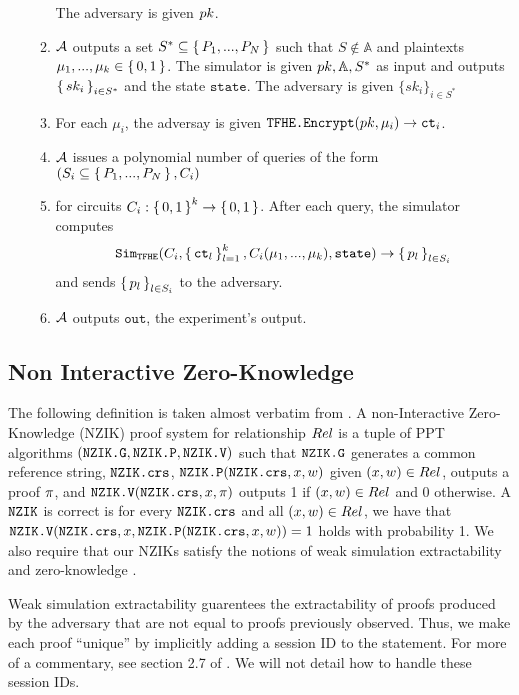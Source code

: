 \begin{definition}
\begin{itemize}
\begin{enumerate}
						The adversary is given $pk$.
						\item $\mathcal{A}$ outputs a set $S^* \subseteq \set{P_1, ..., P_N}$ such that $S \notin \mathbb{A}$
						and plaintexts $\mu_1, ..., \mu_k \in \set{0, 1}$. The simulator is given $pk, \mathbb{A}, S^*$ as input
						and outputs $\set{sk_i}_{i \in S^*}$ and the state $\texttt{state}$. The adversary is given $\{sk_i\}_{i \in S^*}$
						\item For each $\mu_i$, the adversay is given $\texttt{TFHE.Encrypt}(pk, \mu_i) \rightarrow \texttt{ct}_i$.
						\item $\mathcal{A}$ issues a polynomial number of queries of the form $(S_i \subseteq \set{P_1, ..., P_N}, C_i)$
						\item for circuits $C_i: \set{0, 1}^k \rightarrow \set{0, 1}$. After each query, the simulator computes
						$$
							\texttt{Sim}_{{\texttt{TFHE}}}(C_i, \set{\texttt{ct}_l}_{l=1}^k, C_i(\mu_1, ..., \mu_k), \texttt{state}) \rightarrow \set{p_l}_{l \in S_i}
						$$
						and sends $\set{p_l}_{l \in S_i}$ to the adversary.
						\item $\mathcal{A}$ outputs $\texttt{out}$, the experiment's output.

		      \end{enumerate}
	\end{itemize}

\end{definition}

\subsection{Non Interactive Zero-Knowledge}
The following definition is taken almost verbatim from \cite{catalano2022adaptively}.
A non-Interactive Zero-Knowledge (NZIK) proof system for relationship $Rel$
is a tuple of PPT algorithms $(\texttt{NZIK.G}, \texttt{NZIK.P}, \texttt{NZIK.V})$ such that $\texttt{NZIK.G}$ generates a common reference string, $\texttt{NZIK.crs}$,
$\texttt{NZIK.P}(\texttt{NZIK.crs}, x, w)$ given $(x, w) \in Rel$, outputs a proof $\pi$,
and $\texttt{NZIK.V}(\texttt{NZIK.crs}, x, \pi)$ outputs 1 if $(x, w) \in Rel$ and 0 otherwise.
A $\texttt{NZIK}$ is correct is for every $\texttt{NZIK.crs}$ and all $(x, w) \in Rel$, we have that\\
$\texttt{NZIK.V}(\texttt{NZIK.crs}, x, \texttt{NZIK.P}(\texttt{NZIK.crs}, x, w)) = 1$ holds with probability 1.
We also require that our NZIKs satisfy the notions of weak simulation extractability \cite{sahai1999non} and 
zero-knowledge \cite{feige1990multiple}.

Weak simulation extractability guarentees the extractability of proofs produced
by the adversary that are not equal to proofs previously observed. Thus, we make each
proof ``unique'' by implicitly adding a session ID to the statement. For more of a commentary,
see section 2.7 of \cite{catalano2022adaptively}. We will not detail how to handle these session IDs.

